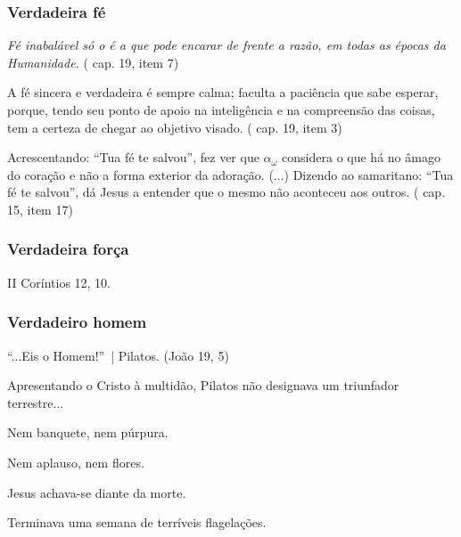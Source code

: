 \documentclass[12pt,a4paper]{article}
\begin{document}
			\subsubsection{Verdadeira f\'e}\label{feh}
				\begin{flushright}
				\end{flushright}

				\emph{F\'e inabal\'avel s\'o o \'e a que pode encarar de frente a raz\~ao, em todas as \'epocas da Humanidade.} (\cite{ese} cap. 19, item 7)

				A f\'e sincera e verdadeira \'e sempre calma; faculta a paci\^encia que sabe esperar, porque, tendo seu ponto de apoio na intelig\^encia e na compreens\~ao das coisas, tem a certeza de chegar ao objetivo visado. (\cite{ese} cap. 19, item 3)

				Acrescentando: \textquotedblleft Tua f\'e te salvou\textquotedblright, fez ver que $ \alpha_\omega $ considera o que h\'a no \^amago do cora\c{c}\~ao e n\~ao a forma exterior da adora\c{c}\~ao. (...) Dizendo ao samaritano: \textquotedblleft Tua f\'e te salvou\textquotedblright, d\'a Jesus a entender que o mesmo n\~ao aconteceu aos outros. (\cite{genese} cap. 15, item 17)

			\subsubsection{Verdadeira for\c{c}a}
			\begin{flushright}
			\end{flushright}

				II Cor\'intios 12, 10.

			\subsubsection{Verdadeiro homem}\label{homem}
				\begin{flushright}
				\end{flushright}

				\textquotedblleft...Eis o Homem!\textquotedblright\, | Pilatos. (Jo\~ao 19, 5)

				Apresentando o Cristo \`a multid\~ao, Pilatos n\~ao designava um triunfador terrestre...

				Nem banquete, nem p\'urpura.

				Nem aplauso, nem flores.

				Jesus achava-se diante da morte.

				Terminava uma semana de terr\'iveis flagela\c{c}\~oes\cite{autoflagelo}.
\end{document}
